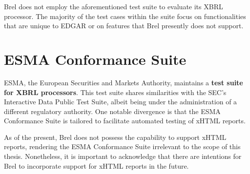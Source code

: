 Brel does not employ the aforementioned test suite to evaluate its XBRL processor.
The majority of the test cases within the suite focus on functionalities that are unique to EDGAR or on features that Brel presently does not support.

\section{ESMA Conformance Suite}

ESMA, the European Securities and Markets Authority, 
maintains a 
\textcolor{turkishrose}{\textbf{test suite for XBRL processors}}\cite{esma_conformance_suite}.
This test suite shares similarities with the SEC's Interactive Data Public Test Suite, albeit being under the administration of a different regulatory authority. 
One notable divergence is that the ESMA Conformance Suite is tailored to facilitate automated testing of xHTML reports.

As of the present, Brel does not possess the capability to support xHTML reports, 
rendering the ESMA Conformance Suite irrelevant to the scope of this thesis. 
Nonetheless, it is important to acknowledge that there are intentions for Brel to incorporate support for xHTML reports in the future.
